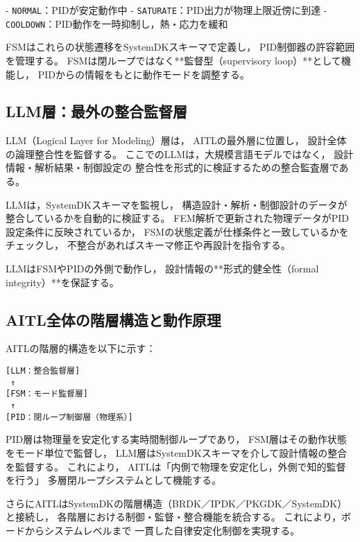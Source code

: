 - \texttt{NORMAL}：PIDが安定動作中  
- \texttt{SATURATE}：PID出力が物理上限近傍に到達  
- \texttt{COOLDOWN}：PID動作を一時抑制し，熱・応力を緩和  

FSMはこれらの状態遷移をSystemDKスキーマで定義し，
PID制御器の許容範囲を管理する。
FSMは閉ループではなく**監督型（supervisory loop）**として機能し，
PIDからの情報をもとに動作モードを調整する。

\subsection{LLM層：最外の整合監督層}
LLM（Logical Layer for Modeling）層は，
AITLの最外層に位置し，
設計全体の論理整合性を監督する。
ここでのLLMは，大規模言語モデルではなく，
設計情報・解析結果・制御設定の
整合性を形式的に検証するための整合監査層である。

LLMは，SystemDKスキーマを監視し，
構造設計・解析・制御設計のデータが整合しているかを自動的に検証する。
FEM解析で更新された物理データがPID設定条件に反映されているか，
FSMの状態定義が仕様条件と一致しているかをチェックし，
不整合があればスキーマ修正や再設計を指令する。

LLMはFSMやPIDの外側で動作し，
設計情報の**形式的健全性（formal integrity）**を保証する。

\subsection{AITL全体の階層構造と動作原理}
AITLの階層的構造を以下に示す：

\begin{center}
\texttt{[LLM：整合監督層]}\\
\texttt{     ↑}\\
\texttt{[FSM：モード監督層]}\\
\texttt{     ↑}\\
\texttt{[PID：閉ループ制御層（物理系）]}
\end{center}

PID層は物理量を安定化する実時間制御ループであり，
FSM層はその動作状態をモード単位で監督し，
LLM層はSystemDKスキーマを介して設計情報の整合を監督する。
これにより，
AITLは「内側で物理を安定化し，外側で知的監督を行う」
多層閉ループシステムとして機能する。

さらにAITLはSystemDKの階層構造（BRDK／IPDK／PKGDK／SystemDK）と接続し，
各階層における制御・監督・整合機能を統合する。
これにより，ボードからシステムレベルまで
一貫した自律安定化制御を実現する。
